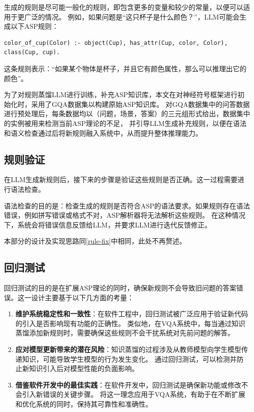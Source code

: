 生成的规则是尽可能一般化的规则，即包含更多的变量和较少的常量，以便可以适用于更广泛的情况。
例如，如果问题是“这只杯子是什么颜色？”，LLM可能会生成以下ASP规则：
\begin{lstlisting}
color_of_cup(Color) :- object(Cup), has_attr(Cup, color, Color), class(Cup, cup).
\end{lstlisting}
这条规则表示：“如果某个物体是杯子，并且它有颜色属性，那么可以推理出它的颜色”。

为了对规则蒸馏LLM进行训练，补充ASP知识库，本文在对神经符号框架进行初始化时，采用了GQA数据集以构建原始ASP知识库。
对GQA数据集中的问答数据进行预处理后，每条数据均以（问题，场景，答案）的三元组形式给出，数据集中的实例被用来检测当前ASP理论的不足，
并引导LLM生成补充规则，以便在语法和语义检查通过后将新规则融入系统中，从而提升整体推理能力。 
\subsection{规则验证}
在LLM生成新规则后，接下来的步骤是验证这些规则是否正确。这一过程需要进行语法检查。

语法检查的目的是：检查生成的规则是否符合ASP的语法要求。如果规则存在语法错误，例如拼写错误或格式不对，ASP解析器将无法解析这些规则。
在这种情况下，系统会将错误信息反馈给LLM，并要求LLM进行迭代反馈修正。

本部分的设计及实现思路同\ref{rule-fix}中相同，此处不再赘述。
\subsection{回归测试}
回归测试的目的是在扩展ASP理论的同时，确保新规则不会导致旧问题的答案错误。这一设计主要基于以下几方面的考量：
\begin{enumerate}[itemsep=0pt,parsep=0pt]
\item \textbf{维护系统稳定性和一致性}：​在软件工程中，回归测试被广泛应用于验证新代码的引入是否影响现有功能的正确性。
类似地，在VQA系统中，每当通过知识蒸馏添加新规则时，需要确保这些规则不会干扰系统对先前问题的解答。
\item \textbf{应对模型更新带来的潜在风险}：​知识蒸馏的过程涉及从教师模型向学生模型传递知识，可能导致学生模型的行为发生变化。
通过回归测试，可以检测并防止新知识引入后对模型性能的负面影响。
\item \textbf{借鉴软件开发中的最佳实践}：​在软件开发中，回归测试是确保新功能或修改不会引入新错误的关键步骤。
将这一理念应用于VQA系统，有助于在不断扩展和优化系统的同时，保持其可靠性和准确性。
\end{enumerate}

